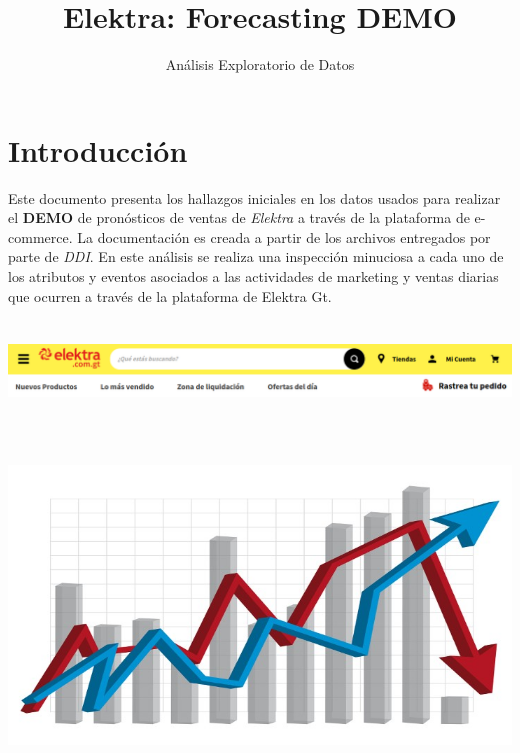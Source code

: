 \documentclass[
]{book}
\title{Elektra: Forecasting DEMO}
\subtitle{Análisis Exploratorio de Datos}
\author{}
\date{\vspace{-2.5em}}
\begin{document}
\maketitle

{
\setcounter{tocdepth}{1}
\tableofcontents
}
\hypertarget{introducciuxf3n}{%
\chapter*{Introducción}\label{introducciuxf3n}}

Este documento presenta los hallazgos iniciales en los datos usados para realizar el \textbf{DEMO} de pronósticos de ventas de \emph{Elektra} a través de la plataforma de e-commerce. La documentación es creada a partir de los archivos entregados por parte de \emph{DDI}. En este análisis se realiza una inspección minuciosa a cada uno de los atributos y eventos asociados a las actividades de marketing y ventas diarias que ocurren a través de la plataforma de Elektra Gt.

\begin{center}\includegraphics[width=650pt,height=75pt]{img/00-intro/ecommerce} \end{center}

\begin{center}\includegraphics[width=700pt,height=250pt]{img/00-intro/forecasting} \end{center}
\end{document}
